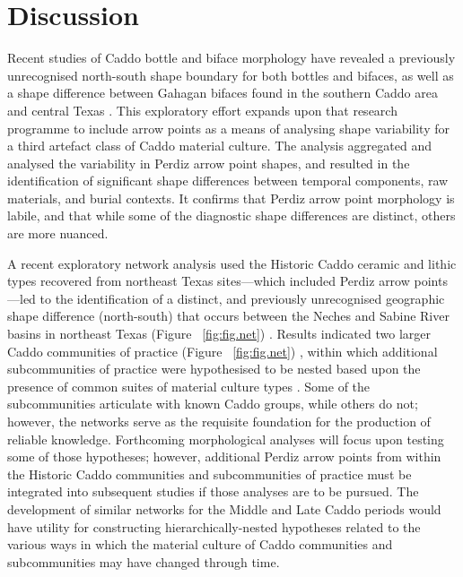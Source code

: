 \documentclass[review]{elsarticle}
\begin{document}
\section*{Discussion}

Recent studies of Caddo bottle and biface morphology have revealed a previously unrecognised north-south shape boundary for both bottles and bifaces, as well as a shape difference between Gahagan bifaces found in the southern Caddo area and central Texas \citep{RN8074,RN7927,RN8158,RN8370,RN8322,RN8312}. This exploratory effort expands upon that research programme to include arrow points as a means of analysing shape variability for a third artefact class of Caddo material culture. The analysis aggregated and analysed the variability in Perdiz arrow point shapes, and resulted in the identification of significant shape differences between temporal components, raw materials, and burial contexts. It confirms that Perdiz arrow point morphology is labile, and that while some of the diagnostic shape differences are distinct, others are more nuanced.

A recent exploratory network analysis used the Historic Caddo ceramic and lithic types recovered from northeast Texas sites---which included Perdiz arrow points---led to the identification of a distinct, and previously unrecognised geographic shape difference (north-south) that occurs between the Neches and Sabine River basins in northeast Texas (Figure ~\ref{fig:fig.net}) \citep{RN8031}. Results indicated two larger Caddo communities of practice (Figure ~\ref{fig:fig.net}) \citep[Figure 16.4]{RN8031}, within which additional subcommunities of practice were hypothesised to be nested based upon the presence of common suites of material culture types \citep[Figures 16.5 and 16.6]{RN8031}. Some of the subcommunities articulate with known Caddo groups, while others do not; however, the networks serve as the requisite foundation for the production of reliable knowledge. Forthcoming morphological analyses will focus upon testing some of those hypotheses; however, additional Perdiz arrow points from within the Historic Caddo communities and subcommunities of practice must be integrated into subsequent studies if those analyses are to be pursued. The development of similar networks for the Middle and Late Caddo periods would have utility for constructing hierarchically-nested hypotheses related to the various ways in which the material culture of Caddo communities and subcommunities may have changed through time.
\end{document}
